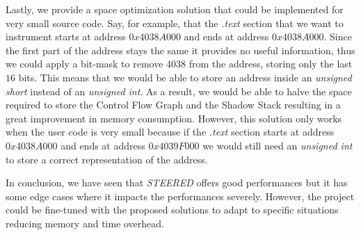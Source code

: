 Lastly, we provide a space optimization solution that could be implemented for
very small source code. Say, for example, that the \textit{.text} section that
we want to instrument starts at address $0x4038A000$ and ends at address
$0x4038A000$. Since the first part of the address stays the same it provides no useful
information, thus we could apply a bit-mask to remove $4038$ from the address, storing
only the last $16$ bits. This means that we would be able to store an address
inside an \textit{unsigned short} instead of an \textit{unsigned int}. As a result,
we would be able to halve the space required to store the Control Flow Graph and
the Shadow Stack resulting in a great improvement in memory consumption. However,
this solution only works when the user code is very small because if the \textit{.text}
section starts at address $0x4038A000$ and ends at address $0x4039F000$ we would
still need an \textit{unsigned int} to store a correct representation of the
address.

In conclusion, we have seen that \textit{STEERED} offers good performances but
it has some edge cases where it impacts the performances severely. However, the
project could be fine-tuned with the proposed solutions to adapt to specific
situations reducing memory and time overhead.
